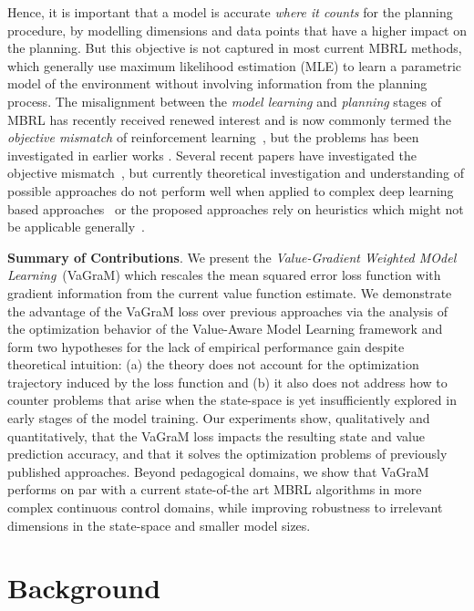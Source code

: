 Hence, it is important that a model is accurate \textit{where it counts} for the planning procedure, by modelling dimensions and data points that have a higher impact on the planning. %
But this objective is not captured in most current MBRL methods, which generally use maximum likelihood estimation (MLE) to learn a parametric model of the environment without involving information from the planning process.
The misalignment between the \emph{model learning} and \emph{planning} stages of MBRL has recently received renewed interest and is now commonly termed the \textit{objective mismatch} of reinforcement learning~\parencite{lambert202objective}, but the problems has been investigated in earlier works \parencite{joseph2013reinforcement}.
Several recent papers have investigated the objective mismatch~\parencite{abachi2020policy,zhang2021learning,AyoubJiaSzepesvariWang2020,grimm2020value,grimm2021proper,nikishin2021control}, but currently theoretical investigation and understanding of possible approaches do not perform well when applied to complex deep learning based approaches~\parencite{lovatto2020decision} or the proposed approaches rely on heuristics which might not be applicable generally~\parencite{nair2020goal}.

\noindent \textbf{Summary of Contributions}. We present the \textit{Value-Gradient Weighted MOdel Learning}~(VaGraM) which rescales the mean squared error loss function with gradient information from the current value function estimate.
We demonstrate the advantage of the VaGraM loss over previous approaches via the analysis of the optimization behavior of the Value-Aware Model Learning framework \parencite{vaml, itervaml} and form two hypotheses for the lack of empirical performance gain despite theoretical intuition: (a) the theory does not account for the optimization trajectory induced by the loss function and (b) it also does not address how to counter problems that arise when the state-space is yet insufficiently explored in early stages of the model training.
Our experiments show, qualitatively and quantitatively, that the VaGraM loss impacts the resulting state and value prediction accuracy, and that it solves the optimization problems of previously published approaches.
Beyond pedagogical domains, we show that VaGraM performs on par with a current state-of-the art MBRL algorithms in more complex continuous control domains, while improving robustness to irrelevant dimensions in the state-space and smaller model sizes.

\section{Background}

